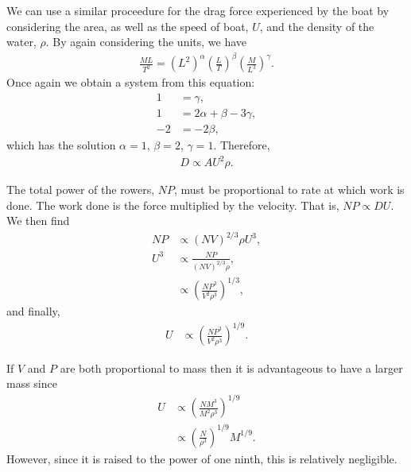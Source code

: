 \documentclass[12pt]{article}
\begin{document}
We can use a similar proceedure for the drag force experienced by the boat by considering the area, as well as the speed of boat, $U$, and the density of the water, $\rho$. By again considering the units, we have
\begin{align*}
\frac{M L}{T^2} = \left( L^2 \right)^\alpha \left( \frac{L}{T} \right)^\beta \left( \frac{M}{L^3} \right)^\gamma.
\end{align*}
Once again we obtain a system from this equation:
\begin{align*}
1 &= \gamma, \\
1 &= 2\alpha + \beta - 3\gamma, \\
-2 &= -2\beta,
\end{align*}
which has the solution $\alpha = 1$, $\beta = 2$, $\gamma = 1$. Therefore,
\begin{align*}
D \propto A U^2 \rho. 
\end{align*}

The total power of the rowers, $NP$, must be proportional to rate at which work is done. The work done is the force multiplied by the velocity. That is, $NP \propto DU$. We then find
\begin{align*}
NP &\propto \left( NV \right)^{2/3} \rho U^3, \\
U^3 &\propto \frac{NP}{\left( NV \right)^{2/3} \rho}, \\
&\propto \left( \frac{NP^3}{V^2 \rho^3} \right)^{1/3},
\end{align*}
and finally,
\begin{align*}
U &\propto \left( \frac{NP^3}{V^2 \rho^3} \right)^{1/9}.
\end{align*}

If $V$ and $P$ are both proportional to mass then it is advantageous to have a larger mass since
\begin{align*}
U &\propto \left( \frac{NM^3}{M^2 \rho^3} \right)^{1/9} \\
&\propto \left( \frac{N}{\rho^3} \right)^{1/9} M^{1/9}.
\end{align*}
However, since it is raised to the power of one ninth, this is relatively negligible.
\end{document}
